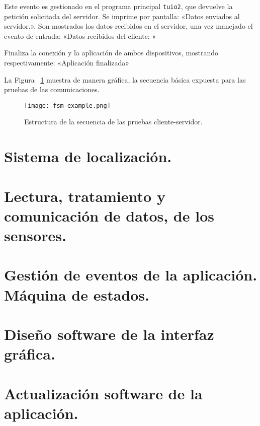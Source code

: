 Este evento es gestionado en el programa principal \texttt{tuio2}, que devuelve la petición solicitada del servidor. Se imprime por pantalla: «Datos enviados al servidor.». Son mostrados los datos recibidos en el servidor, una vez manejado el evento de entrada: «Datos recibidos del cliente: » 

Finaliza la conexión y la aplicación de ambos dispositivos, mostrando respectivamente: «Aplicación finalizada»

La Figura ~\ref{fig:fsmexample} muestra de manera gráfica, la secuencia básica expuesta para las pruebas de las comunicaciones.

\begin{figure}[!h]
\begin{center}
\texttt{[image: fsm\_example.png]}
\caption{Estructura de la secuencia de las pruebas cliente-servidor.}
\label{fig:fsmexample}
\end{center}
\end{figure}


\section{Sistema de localización.}

\section{Lectura, tratamiento y comunicación de datos, de los sensores.}

\section{Gestión de eventos de la aplicación. Máquina de estados.}

\section{Diseño software de la interfaz gráfica.}

\section{Actualización software de la aplicación.}




